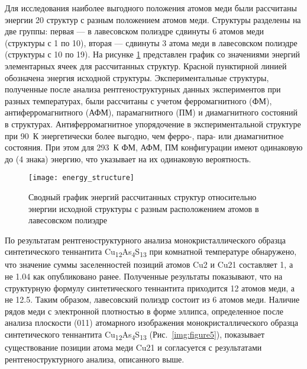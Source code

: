 Для исследования наиболее выгодного положения атомов меди были рассчитаны энергии 20 структур с разным положением атомов меди.
Структуры разделены на две группы: первая --- в лавесовском полиэдре сдвинуты 6 атомов меди (структуры с 1 по 10), вторая --- сдвинуты 3 атома меди в лавесовском полиэдре (структуры с 10 по 19).
На рисунке \ref{img:th} представлен график со значениями энергий элементарных ячеек для рассчитанных структур. Красной пунктирной линией обозначена энергия исходной структуры.
Экспериментальные структуры, полученные после анализа рентгеноструктурных данных  экспериментов при разных температурах, были рассчитаны с учетом ферромагнитного (ФМ), антиферромагнитного (АФМ), парамагнитного (ПМ) и диамагнитного состояний в структурах. 
Антиферромагнитное упорядочение в экспериментальной структуре при 90~К энергетически более выгодно, чем ферро-, пара- или диамагнитное состояния. При этом для 293~К ФМ, АФМ, ПМ конфигурации имеют одинаковую до (4 знака) энергию, что указывает на их одинаковую вероятность.

\begin{figure}[ht]
  \begin{minipage}[ht]{0.9\linewidth}\centering
    \texttt{[image: energy\_structure]}
  \end{minipage}

      \caption[Сводный график энергий рассчитанных структур относительно энергии исходной структуры с разным расположением атомов в лавесовском полиэдре]{Сводный график энергий рассчитанных структур относительно энергии исходной структуры с разным расположением атомов в лавесовском полиэдре}
    \label{img:th}
\end{figure}

По результатам рентгеноструктурного анализа монокристаллического образца синтетического теннантита Cu\textsubscript{12}As\textsubscript{4}S\textsubscript{13} при комнатной температуре обнаружено, что значение суммы заселенностей позиций атомов Cu2 и Cu21 составляет 1, а не 1.04 как опубликовано ранее\cite{Makovicky_2006}.
Полученные результаты показывают, что на структурную формулу синтетического теннантита приходится 12 атомов меди, а не 12.5.
Таким образом, лавесовский полиэдр состоит из 6 атомов меди.
Наличие рядов меди с электронной плотностью в форме эллипса, определенное после анализа плоскости (011) атомарного изображения монокристаллического образца синтетического теннантита Cu\textsubscript{12}As\textsubscript{4}S\textsubscript{13} (Рис.~\ref{img:figure5}), показывает существование позиции атома меди Cu21 и согласуется с результатами рентгеноструктурного анализа, описанного выше.

